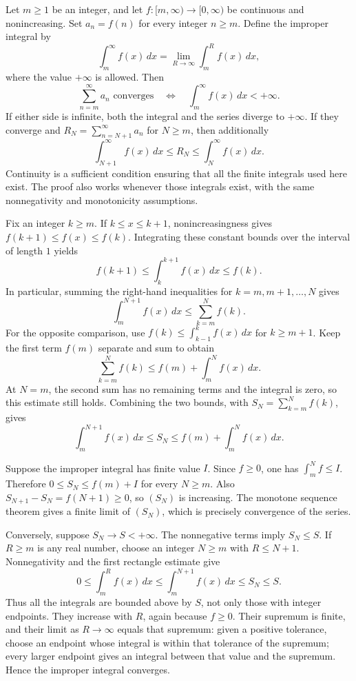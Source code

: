 Let $m\ge1$ be an integer, and let
$f:[m,\infty)\to[0,\infty)$ be continuous and nonincreasing.
Set $a_n=f(n)$ for every integer $n\ge m$.
Define the improper integral by
\[
 \int_m^{\infty}f(x)\,dx
 =\lim_{R\to\infty}\int_m^R f(x)\,dx,
\]
where the value $+\infty$ is allowed. Then
\[
 \sum_{n=m}^{\infty}a_n\text{ converges}
 \quad\Longleftrightarrow\quad
 \int_m^{\infty}f(x)\,dx<+\infty.
\]
If either side is infinite, both the integral and the series diverge
to $+\infty$. If they converge and
$R_N=\sum_{n=N+1}^{\infty}a_n$ for $N\ge m$, then additionally
\[
 \int_{N+1}^{\infty}f(x)\,dx
 \le R_N\le\int_N^{\infty}f(x)\,dx.
\]
Continuity is a sufficient condition ensuring that all the finite
integrals used here exist. The proof also works whenever those
integrals exist, with the same nonnegativity and monotonicity
assumptions.

Fix an integer $k\ge m$. If $k\le x\le k+1$, nonincreasingness
gives $f(k+1)\le f(x)\le f(k)$. Integrating these constant bounds
over the interval of length $1$ yields
\[
 f(k+1)\le\int_k^{k+1}f(x)\,dx\le f(k).
\]
In particular, summing the right-hand inequalities for
$k=m,m+1,\ldots,N$ gives
\[
 \int_m^{N+1}f(x)\,dx\le\sum_{k=m}^{N}f(k).
\]
For the opposite comparison, use
$f(k)\le\int_{k-1}^{k}f(x)\,dx$ for $k\ge m+1$.
Keep the first term $f(m)$ separate and sum to obtain
\[
 \sum_{k=m}^{N}f(k)\le f(m)+\int_m^{N}f(x)\,dx.
\]
At $N=m$, the second sum has no remaining terms and the integral
is zero, so this estimate still holds. Combining the two bounds,
with $S_N=\sum_{k=m}^{N}f(k)$, gives
\[
 \boxed{\int_m^{N+1}f(x)\,dx\le S_N
        \le f(m)+\int_m^{N}f(x)\,dx.}
\]

Suppose the improper integral has finite value $I$.
Since $f\ge0$, one has $\int_m^N f\le I$. Therefore
$0\le S_N\le f(m)+I$ for every $N\ge m$.
Also $S_{N+1}-S_N=f(N+1)\ge0$, so $(S_N)$ is increasing.
The monotone sequence theorem gives a finite limit of $(S_N)$,
which is precisely convergence of the series.

Conversely, suppose $S_N\to S<+\infty$. The nonnegative terms
imply $S_N\le S$. If $R\ge m$ is any real number, choose an
integer $N\ge m$ with $R\le N+1$. Nonnegativity and the first
rectangle estimate give
\[
 0\le\int_m^R f(x)\,dx
 \le\int_m^{N+1}f(x)\,dx\le S_N\le S.
\]
Thus all the integrals are bounded above by $S$, not only those
with integer endpoints. They increase with $R$, again because
$f\ge0$. Their supremum is finite, and their limit as
$R\to\infty$ equals that supremum: given a positive tolerance,
choose an endpoint whose integral is within that tolerance of the
supremum; every larger endpoint gives an integral between that
value and the supremum. Hence the improper integral converges.

